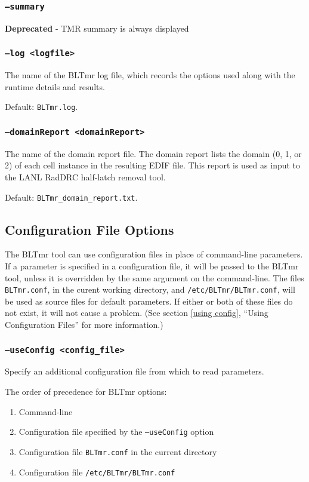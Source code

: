 \documentclass[english]{article}
\begin{document}
\subsubsection{\texttt{--summary}}
\textbf{Deprecated} - TMR summary is always displayed

\subsubsection{\texttt{--log <logfile>}}
The name of the BLTmr log file, which records the options used along with
the runtime details and results. 

Default: \texttt{BLTmr.log}.

\subsubsection{\texttt{--domainReport <domainReport>}}
The name of the domain report file. The domain report lists the domain (0, 1, 
or 2) of each cell instance in the resulting EDIF file. This report is used as 
input to the LANL RadDRC half-latch removal tool. 

Default: \texttt{BLTmr\_domain\_report.txt}.

\subsection{Configuration File Options}
\label{config options}
The BLTmr tool can use configuration files in place of command-line parameters. 
If a parameter is specified in a configuration file, it will be passed to the 
BLTmr tool, unless it is overridden by the same argument on the command-line. 
The files \texttt{BLTmr.conf}, in the curent working directory, and 
\texttt{/etc/BLTmr/BLTmr.conf}, will be used as source files for default 
parameters. If either or both of these files do not exist, it will not cause a 
problem. (See section \ref{using config}, ``Using Configuration Files'' for
more information.)

\subsubsection{\texttt{--useConfig <config\_file>}}
\label{useConfig}
Specify an additional configuration file from which to read parameters.

The order of precedence for BLTmr options:
\begin{enumerate}
  \item Command-line
  \item Configuration file specified by the \texttt{--useConfig} option
  \item Configuration file \texttt{BLTmr.conf} in the current directory
  \item Configuration file \texttt{/etc/BLTmr/BLTmr.conf}
\end{enumerate}
\end{document}
